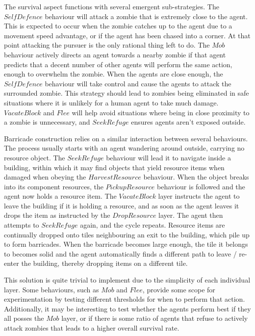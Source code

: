 \documentclass[12pt,a4paper]{article}
\begin{document}
The survival aspect functions with several emergent sub-strategies. The $SelfDefence$ behaviour will attack a zombie that is extremely close to the agent. This is expected to occur when the zombie catches up to the agent due to a movement speed advantage, or if the agent has been chased into a corner. At that point attacking the pursuer is the only rational thing left to do. The $Mob$ behaviour actively directs an agent towards a nearby zombie if that agent predicts that a decent number of other agents will perform the same action, enough to overwhelm the zombie. When the agents are close enough, the $SelfDefence$ behaviour will take control and cause the agents to attack the surrounded zombie. This strategy should lead to zombies being eliminated in safe situations where it is unlikely for a human agent to take much damage. $VacateBlock$ and $Flee$ will help avoid situations where being in close proximity to a zombie is unnecessary, and $SeekRefuge$ ensures agents aren't exposed outside.

Barricade construction relies on a similar interaction between several behaviours. The process usually starts with an agent wandering around outside, carrying no resource object. The $SeekRefuge$ behaviour will lead it to navigate inside a building, within which it may find objects that yield resource items when damaged when obeying the $HarvestResource$ behaviour. When the object breaks into its component resources, the $PickupResource$ behaviour is followed and the agent now holds a resource item. The $VacateBlock$ layer instructs the agent to leave the building if it is holding a resource, and as soon as the agent leaves it drops the item as instructed by the $DropResource$ layer. The agent then attempts to $SeekRefuge$ again, and the cycle repeats. Resource items are continually dropped onto tiles neighbouring an exit to the building, which pile up to form barricades. When the barricade becomes large enough, the tile it belongs to becomes solid and the agent automatically finds a different path to leave / re-enter the building, thereby dropping items on a different tile.

This solution is quite trivial to implement due to the simplicity of each individual layer. Some behaviours, such as $Mob$ and $Flee$, provide some scope for experimentation by testing different thresholds for when to perform that action. Additionally, it may be interesting to test whether the agents perform best if they all posses the $Mob$ layer, or if there is some ratio of agents that refuse to actively attack zombies that leads to a higher overall survival rate.
\end{document}
